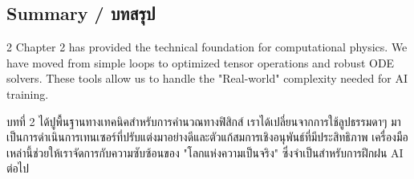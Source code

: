 \subsection{Summary \quad / \quad \textthai{บทสรุป}}
\begin{paracol}{2}
Chapter 2 has provided the technical foundation for computational physics. We have moved from simple loops to optimized tensor operations and robust ODE solvers. These tools allow us to handle the "Real-world" complexity needed for AI training.

\switchcolumn

\begin{thai}
บทที่ 2 ได้ปูพื้นฐานทางเทคนิคสำหรับการคำนวณทางฟิสิกส์ เราได้เปลี่ยนจากการใช้ลูปธรรมดาๆ มาเป็นการดำเนินการเทนเซอร์ที่ปรับแต่งมาอย่างดีและตัวแก้สมการเชิงอนุพันธ์ที่มีประสิทธิภาพ เครื่องมือเหล่านี้ช่วยให้เราจัดการกับความซับซ้อนของ "โลกแห่งความเป็นจริง" ซึ่งจำเป็นสำหรับการฝึกฝน AI ต่อไป
\end{thai}
\end{paracol}
